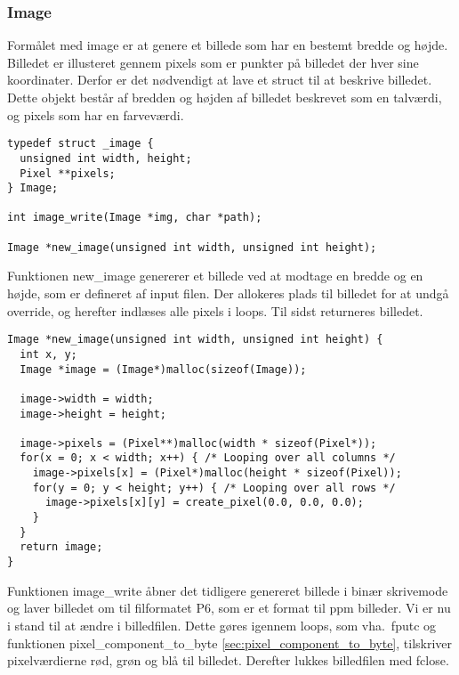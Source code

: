 \subsubsection{Image}
Formålet med image er at genere et billede som har en bestemt bredde og højde. Billedet er illusteret gennem pixels som er punkter på billedet der hver sine koordinater. Derfor er det nødvendigt at lave et struct til at beskrive billedet. Dette objekt består af bredden og højden af billedet beskrevet som en talværdi, og pixels som har en farveværdi.

\begin{lstlisting}[style=Cstyle, caption=light struct]
typedef struct _image {
  unsigned int width, height;
  Pixel **pixels;
} Image;

int image_write(Image *img, char *path);

Image *new_image(unsigned int width, unsigned int height);
\end{lstlisting}

Funktionen new\_image genererer et billede ved at modtage en bredde og en højde, som er defineret af input filen. Der allokeres plads til billedet for at undgå override, og herefter indlæses alle pixels i loops. Til sidst returneres billedet.

\begin{lstlisting}[style=Cstyle, caption=light struct]
Image *new_image(unsigned int width, unsigned int height) {
  int x, y;
  Image *image = (Image*)malloc(sizeof(Image));
  
  image->width = width;
  image->height = height;

  image->pixels = (Pixel**)malloc(width * sizeof(Pixel*));
  for(x = 0; x < width; x++) { /* Looping over all columns */
    image->pixels[x] = (Pixel*)malloc(height * sizeof(Pixel));
    for(y = 0; y < height; y++) { /* Looping over all rows */
      image->pixels[x][y] = create_pixel(0.0, 0.0, 0.0);
    }
  }
  return image;
}
\end{lstlisting}

Funktionen image\_write åbner det tidligere genereret billede i binær skrivemode og laver billedet om til filformatet P6, som er et format til ppm billeder. Vi er nu i stand til at ændre i billedfilen. Dette gøres igennem loops, som vha.\ fputc og funktionen pixel\_component\_to\_byte \ref{sec:pixel_component_to_byte}, tilskriver pixelværdierne rød, grøn og blå til billedet. Derefter lukkes billedfilen med fclose.  


